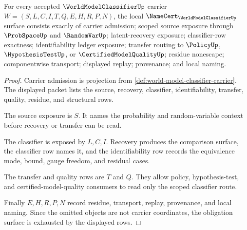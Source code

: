 \begin{theorem}
\label{thm:world-model-classifier-namecert-obligations}
For every accepted $\WorldModelClassifierUp$ carrier $W=(S,L,C,I,T,Q,E,H,R,P,N)$, the local $\NameCert_{\WorldModelClassifierUp}$ surface consists exactly of carrier admission; scoped source exposure through $\ProbSpaceUp$ and $\RandomVarUp$; latent-recovery exposure; classifier-row exactness; identifiability ledger exposure; transfer routing to $\PolicyUp$, $\HypothesisTestUp$, or $\CertifiedModelQualityUp$; residue nonescape; componentwise transport; displayed replay; provenance; and local naming.
\end{theorem}
\begin{proof}
Carrier admission is projection from \autoref{def:world-model-classifier-carrier}. The displayed packet lists the source, recovery, classifier, identifiability, transfer, quality, residue, and structural rows.

The source exposure is $S$. It names the probability and random-variable context before recovery or transfer can be read.

The classifier is exposed by $L,C,I$. Recovery produces the comparison surface, the classifier row names it, and the identifiability row records the equivalence mode, bound, gauge freedom, and residual cases.

The transfer and quality rows are $T$ and $Q$. They allow policy, hypothesis-test, and certified-model-quality consumers to read only the scoped classifier route.

Finally $E,H,R,P,N$ record residue, transport, replay, provenance, and local naming. Since the omitted objects are not carrier coordinates, the obligation surface is exhausted by the displayed rows.
\end{proof}

